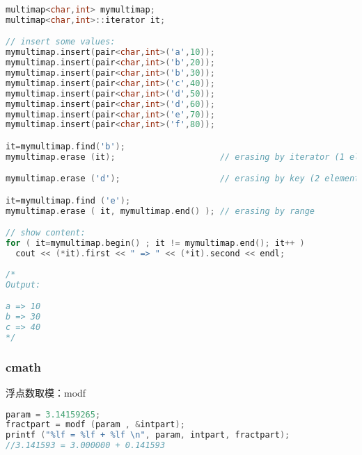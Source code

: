 	\begin{lstlisting}[language=c++]
multimap<char,int> mymultimap;
multimap<char,int>::iterator it;

// insert some values:
mymultimap.insert(pair<char,int>('a',10));
mymultimap.insert(pair<char,int>('b',20));
mymultimap.insert(pair<char,int>('b',30));
mymultimap.insert(pair<char,int>('c',40));
mymultimap.insert(pair<char,int>('d',50));
mymultimap.insert(pair<char,int>('d',60));
mymultimap.insert(pair<char,int>('e',70));
mymultimap.insert(pair<char,int>('f',80));

it=mymultimap.find('b');
mymultimap.erase (it);                     // erasing by iterator (1 element)

mymultimap.erase ('d');                    // erasing by key (2 elements)

it=mymultimap.find ('e');
mymultimap.erase ( it, mymultimap.end() ); // erasing by range

// show content:
for ( it=mymultimap.begin() ; it != mymultimap.end(); it++ )
  cout << (*it).first << " => " << (*it).second << endl;
    
/*
Output:

a => 10
b => 30
c => 40
*/
	\end{lstlisting}
    \subsubsection{cmath}
	浮点数取模：modf\\
	\begin{lstlisting}[language=c++]
param = 3.14159265;
fractpart = modf (param , &intpart);
printf ("%lf = %lf + %lf \n", param, intpart, fractpart);
//3.141593 = 3.000000 + 0.141593
	\end{lstlisting}